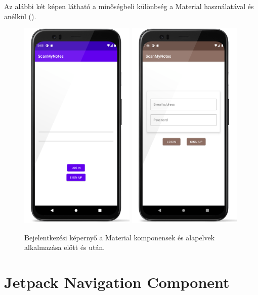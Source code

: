 Az alábbi két képen látható a minőségbeli különbség a Material használatával és anélkül ().

\begin{figure}[!ht]
	\centering
	\includegraphics[width=55mm, keepaspectratio]{figures/login_screenshot_before.png}
	\includegraphics[width=55mm, keepaspectratio]{figures/login_screenshot_after.png}
	\caption{Bejelentkezési képernyő a Material komponensek és alapelvek alkalmazása előtt és után.}
	\label{fig:MaterialBeforeAfter}
\end{figure}

\section{Jetpack Navigation Component}

